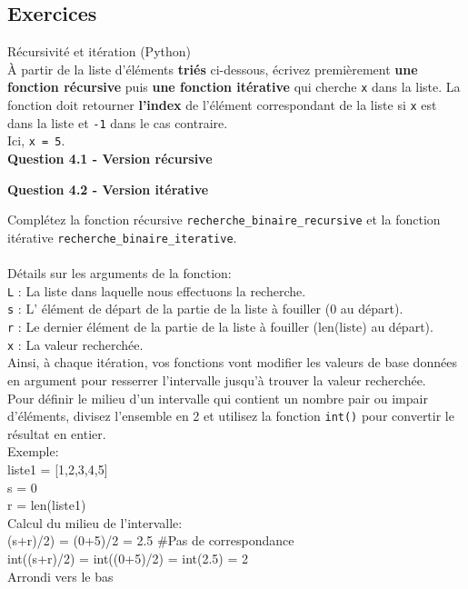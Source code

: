 \subsection{Exercices}

\begin{Exercice}[20 minutes] Récursivité et itération (Python)\\

À partir de la liste d'éléments \textbf{triés} ci-dessous, écrivez premièrement \textbf{une fonction récursive} puis \textbf{une fonction itérative} qui cherche \lstinline{x} dans la liste. La fonction doit retourner \textbf{l'index} de l'élément correspondant de la liste si \lstinline{x} est dans la liste et \lstinline{-1} dans le cas contraire.\\
Ici, \lstinline{x = 5}.\\

\textbf{Question 4.1 - Version récursive}


\textbf{Question 4.2 - Version itérative}



    \begin{conseil}
        Complétez la fonction récursive \lstinline{recherche_binaire_recursive} et la fonction itérative \lstinline{recherche_binaire_iterative}.\\\\
        Détails sur les arguments de la fonction:\\
        \lstinline{L} : La liste dans laquelle nous effectuons la recherche.\\
        \lstinline{s} : L' élément de départ de la partie de la liste à fouiller (0 au départ).\\
        \lstinline{r} : Le dernier élément de la partie de la liste à fouiller (len(liste) au départ).\\
        \lstinline{x} : La valeur recherchée.\\

        Ainsi, à chaque itération, vos fonctions vont modifier les valeurs de base données en argument pour resserrer l'intervalle jusqu'à trouver la valeur recherchée.\\        
        Pour définir le milieu d'un intervalle qui contient un nombre pair ou impair d'éléments, divisez l'ensemble en 2 et utilisez la fonction \lstinline{int()} pour convertir le résultat en entier. \\
        Exemple:\\
            liste1 = [1,2,3,4,5]\\
            s = 0\\
            r = len(liste1)\\
            Calcul du milieu de l'intervalle:\\
            (s+r)/2) = (0+5)/2 = 2.5 \#Pas de correspondance\\
            int((s+r)/2) = int((0+5)/2) = int(2.5) = 2 \\
            Arrondi vers le bas
        \\
        

\end{conseil}
\end{Exercice}
